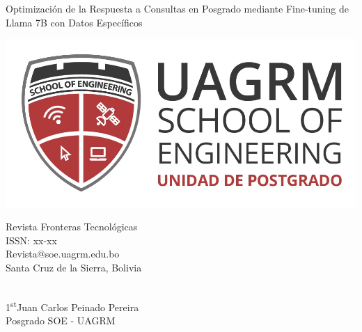\documentclass[12pt,twocolumn]{article}
\begin{document}
    \begin{titlepage}
        \centering
        \thispagestyle{empty}
        {\Huge Optimización de la Respuesta a Consultas en Posgrado mediante Fine-tuning de Llama 7B con Datos Específicos \\}
        \vspace{3cm}
    \begin{minipage}[t]{0.3\textwidth}
        \vspace{0pt}
        \includegraphics[width=\linewidth]{logo3}
    \end{minipage}\vline
    \begin{minipage}[t]{0.4\textwidth}
        \vspace{5pt}
        { \small Revista Fronteras Tecnológicas}\\
        { \small ISSN: xx-xx}\\
        { \small Revista@soe.uagrm.edu.bo}\\
        { \small Santa Cruz de la Sierra, Bolivia}
    \end{minipage}\\
    \vspace{3cm}
    {\Large {1\textsuperscript{st}Juan Carlos Peinado Pereira}}\\
    {\small Posgrado SOE - UAGRM}\\
    \end{titlepage}
\titlespacing*{\section}{0pt}{0cm}{0cm}
\titlespacing*{\subsection}{0pt}{0cm}{0cm}
\end{document}
